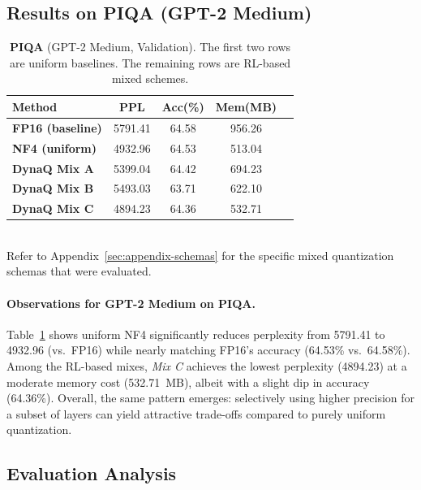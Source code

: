 \documentclass{article}
\begin{document}
	\subsection{Results on PIQA (GPT-2 Medium)}
	\label{sec:piqa-medium}
	
	\begin{table}[ht]
		\centering
		\caption{\small \textbf{PIQA} (GPT-2 Medium, Validation). The first two rows are uniform baselines. The remaining rows are RL-based mixed schemes.}
		\label{tab:piqa-medium}
		\begin{tabular}{lcccc}
			\toprule
			\textbf{Method} & \textbf{PPL} & \textbf{Acc(\%)} & \textbf{Mem(MB)} \\
			\midrule
			\textbf{FP16 (baseline)} & 5791.41 & 64.58 & 956.26 \\
			\textbf{NF4 (uniform)}   & 4932.96 & 64.53 & 513.04 \\
			\midrule
			\textbf{DynaQ Mix A}     & 5399.04 & 64.42 & 694.23 \\
			\textbf{DynaQ Mix B}     & 5493.03 & 63.71 & 622.10 \\
			\textbf{DynaQ Mix C}     & 4894.23 & 64.36 & 532.71 \\
			\bottomrule
		\end{tabular}
		\vspace{-1em}
	\end{table}
	
	
	\textbf{}
	\\
	\small{Refer to Appendix~\ref{sec:appendix-schemas} for the specific mixed quantization schemas that were evaluated.}
	
	
	\paragraph{Observations for GPT-2 Medium on PIQA.}
	Table~\ref{tab:piqa-medium} shows uniform NF4 significantly reduces perplexity from 5791.41 to 4932.96 (vs.\ FP16) while nearly matching FP16's accuracy (64.53\% vs.\ 64.58\%). Among the RL-based mixes, \emph{Mix C} achieves the lowest perplexity (4894.23) at a moderate memory cost (532.71~MB), albeit with a slight dip in accuracy (64.36\%). Overall, the same pattern emerges: selectively using higher precision for a subset of layers can yield attractive trade-offs compared to purely uniform quantization.
	
	\subsection{Evaluation Analysis}
	
\end{document}
